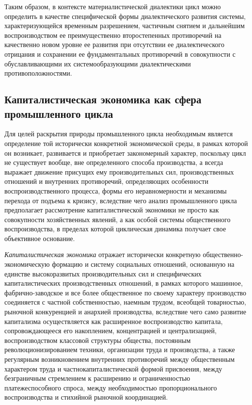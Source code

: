 Таким образом, в контексте материалистической диалектики цикл можно определить в качестве специфической формы диалектического развития системы, характеризующейся временным разрешением, частичным снятием и дальнейшим воспроизводством ее преимущественно второстепенных противоречий на качественно новом уровне ее развития при отсутствии ее диалектического отрицания и сохранении ее фундаментальных противоречий в совокупности с обуславливающими их системообразующими диалектическими противоположностями.

\subsection{Капиталистическая экономика как сфера промышленного цикла}
Для целей раскрытия природы промышленного цикла необходимым является определение той исторически конкретной экономической среды, в рамках которой он возникает, развивается и приобретает закономерный характер, поскольку цикл не существует вообще, вне определенного способа производства, а всегда выражает движение присущих ему производительных сил, производственных отношений и внутренних противоречий, определяющих особенности воспроизводственного процесса, формы его неравномерности и механизмы перехода от подъема к кризису, вследствие чего анализ промышленного цикла предполагает рассмотрение капиталистической экономики не просто как совокупности хозяйственных явлений, а как особой системы общественного воспроизводства, в пределах которой циклическая динамика получает свое объективное основание.

\textit{Капиталистическая экономика} отражает исторически конкретную общественно-экономическую формацию и систему социальных отношений, основанную на единстве высокоразвитых производительных сил и специфических капиталистических производственных отношений, в рамках которого машинное, фабрично-заводское и все более общественное по своему характеру производство соединяется с частной собственностью, наемным трудом, всеобщей товарностью, рыночной конкуренцией и анархией производства, вследствие чего само развитие капитализма осуществляется как расширенное воспроизводство капитала, сопровождающееся его накоплением, концентрацией и централизацией, воспроизводством классовой структуры общества, постоянным революционизированием техники, организации труда и производства, а также регулярным возникновением внутренних противоречий между общественным характером труда и частнокапиталистической формой присвоения, между безграничным стремлением к расширению и ограниченностью платежеспособного спроса, между необходимостью пропорционального воспроизводства и стихийной рыночной координацией.

